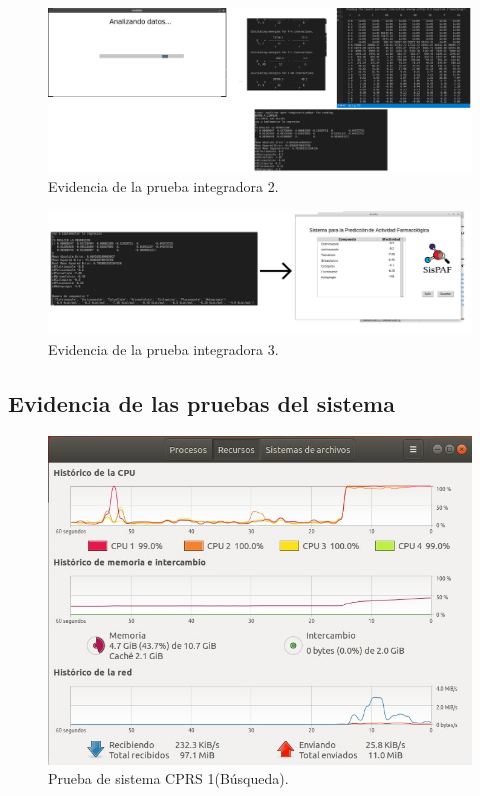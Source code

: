 \begin{figure}[H]
    \centering
    \includegraphics[scale=0.25]{Anexo/imagenes/Imagenes_Pruebas/M2Integracion.png}
    \caption{Evidencia de la prueba integradora 2.}
    \label{M2Integradora}
\end{figure}

\begin{figure}[H]
    \centering
    \includegraphics[scale=0.28]{Anexo/imagenes/Imagenes_Pruebas/M3Integracion.png}
    \caption{Evidencia de la prueba integradora 3.}
    \label{M3Integradora}
\end{figure}

\subsection{Evidencia de las pruebas del sistema}
\begin{figure}[H]
    \centering
    \includegraphics[scale=0.60]{Capitulo4/Documentos/Casos_de_sistema/imagenes_casos/BusquedaErik.jpeg}
    \caption{Prueba de sistema CPRS 1(Búsqueda).}
    \label{Evidencia2_1-0}
\end{figure}


